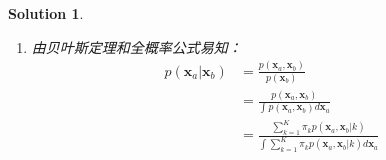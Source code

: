 \documentclass[a4paper,UTF8]{article}
\newtheorem*{solution}{Solution}
\numberwithin{equation}{section}
\begin{document}
\begin{solution}
\begin{enumerate}[$1.$]
\begin{align*}
       	&=\sum_{i=1}^{N}w_k^i\boldsymbol{\Sigma}^{-1}(\boldsymbol{x_i}-\boldsymbol{\mu}_k)\\&=0\\
       	\frac{\partial \mathcal{Q}}{\partial\boldsymbol{\Sigma}}&=-\frac{1}{2}\sum_{i=1}^{N}\sum_{k=1}^Kw_k^i[\frac{\partial((\boldsymbol{x_i}-\boldsymbol{\mu}_k)^T\boldsymbol{\Sigma}^{-1}(\boldsymbol{x_i}-\boldsymbol{\mu}_k))}{\partial\boldsymbol{\Sigma}}+\frac{\partial\ln |\boldsymbol{\Sigma}|}{\partial\boldsymbol{\Sigma}}]\\
       	&=-\frac{1}{2}\sum_{i=1}^{N}\sum_{k=1}^Kw_k^i[{-\boldsymbol{\Sigma}^{-1}}^T(\boldsymbol{x_i}-\boldsymbol{\mu}_k)(\boldsymbol{x_i}-\boldsymbol{\mu}_k)^T{\boldsymbol{\Sigma}^{-1}}^T+{\boldsymbol{\Sigma}^{-1}}^T]\\
       	&=0
       \end{align*}
       所以$$\boldsymbol{\mu}_k=\frac{\sum_{i=1}^{N}w_k^i\boldsymbol{x_i}}{\sum_{i=1}^{N}w_k^i}$$
       \begin{align*}
       	 \boldsymbol{\Sigma}&=\frac{\sum_{i=1}^{N}\sum_{k=1}^{K}w_k^i(\boldsymbol{x_i}-\boldsymbol{\mu}_k)(\boldsymbol{x_i}-\boldsymbol{\mu}_k)^T}{\sum_{i=1}^{N}\sum_{k=1}^{K}w_k^i}
       \end{align*}
       $\boldsymbol{\pi}_k$还需满足$\sum_{k=1}^{K}\boldsymbol{\pi}_k=1$，所以加上拉格郎日项：$$\mathcal{Q}':=\mathcal{Q}+\lambda(\sum_{k=1}^{K}\boldsymbol{\pi}_k-1)$$求导得：
       \begin{align*}
       	\frac{\partial \mathcal{Q}'}{\partial\boldsymbol{\pi}_k}&=\sum_{i=1}^{N}w_k^i\frac{1}{\boldsymbol{\pi}_k}+\lambda
       	=0\\
       	\frac{\partial \mathcal{Q}'}{\partial\lambda}&=\sum_{k=1}^{K}\boldsymbol{\pi}_k-1=0
       \end{align*}
       得到$\boldsymbol{\pi}_k=-\frac{\sum_{i=1}^{N}w_k^i}{\lambda}$，又有$1=\sum_{k=1}^{K}\boldsymbol{\pi}_k=-\frac{\sum_{i=1}^{N}\sum_{k=1}^{K}w_k^i}{\lambda}-\frac{N}{\lambda}$
       ，所以$$\lambda=-N,\boldsymbol{\pi}_k=\frac{\sum_{i=1}^{N}w_k^i}{N}$$
       以上部分参考自~\citep{timmurphy.org}。
	\item 由贝叶斯定理和全概率公式易知：
       \begin{align*}
       	p(\boldsymbol{x}_a|\boldsymbol{x}_b)&=\frac{p(\boldsymbol{x}_a,\boldsymbol{x}_b)}{p(\boldsymbol{x}_b)}\\
       	&=\frac{p(\boldsymbol{x}_a,\boldsymbol{x}_b)}{\int p(\boldsymbol{x}_a,\boldsymbol{x}_b)d\boldsymbol{x}_a}\\
       	&=\frac{\sum_{k=1}^{K}\pi_kp(\boldsymbol{x}_a,\boldsymbol{x}_b|k)}{\int \sum_{k=1}^{K}\pi_kp(\boldsymbol{x}_a,\boldsymbol{x}_b|k)d\boldsymbol{x}_a}\\

\end{align*}
\end{enumerate}
\end{solution}
\end{document}
